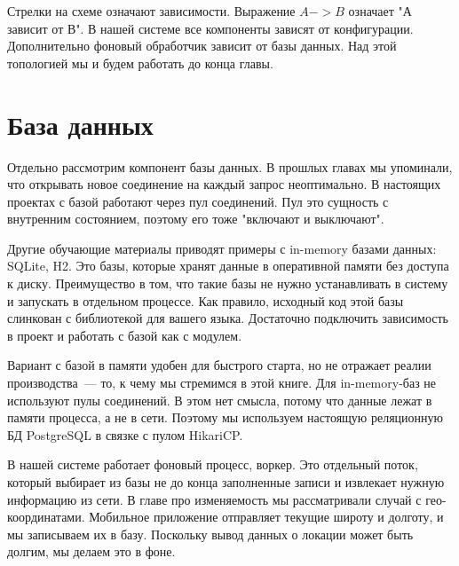 
Стрелки на схеме означают зависимости. Выражение $A -> B$ означает "А зависит
от В". В нашей системе все компоненты зависят от конфигурации. Дополнительно
фоновый обработчик зависит от базы данных. Над этой топологией мы и будем
работать до конца главы.

\section{База данных}

Отдельно рассмотрим компонент базы данных. В прошлых главах мы упоминали, что
открывать новое соединение на каждый запрос неоптимально. В настоящих проектах с
базой работают через пул соединений. Пул это сущность с внутренним состоянием,
поэтому его тоже "включают и выключают".

Другие обучающие материалы приводят примеры с in-memory базами данных: SQLite,
H2. Это базы, которые хранят данные в оперативной памяти без доступа к
диску. Преимущество в том, что такие базы не нужно устанавливать в систему и
запускать в отдельном процессе. Как правило, исходный код этой базы слинкован с
библиотекой для вашего языка. Достаточно подключить зависимость в проект и
работать с базой как с модулем.

Вариант с базой в памяти удобен для быстрого старта, но не отражает реалии
производства~--- то, к чему мы стремимся в этой книге. Для in-memory-баз не
используют пулы соединений. В этом нет смысла, потому что данные лежат в памяти
процесса, а не в сети. Поэтому мы используем настоящую реляционную БД PostgreSQL
в связке с пулом HikariCP.

В нашей системе работает фоновый процесс, воркер. Это отдельный поток, который
выбирает из базы не до конца заполненные записи и извлекает нужную информацию из
сети. В главе про изменяемость мы рассматривали случай с
гео-координатами. Мобильное приложение отправляет текущие широту и долготу, и мы
записываем их в базу. Поскольку вывод данных о локации может быть долгим, мы
делаем это в фоне.

